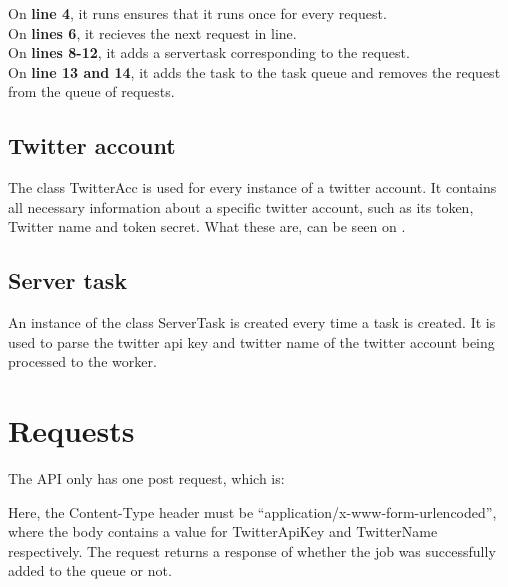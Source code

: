 On \textbf{line 4}, it runs ensures that it runs once for every request. \\
On \textbf{lines 6}, it recieves the next request in line.\\
On \textbf{lines 8-12}, it adds a servertask corresponding to the request.\\
On \textbf{line 13 and 14}, it adds the task to the task queue and removes the
request from the queue of requests.\\


\subsection{Twitter account}
The class TwitterAcc is used for every instance of a twitter account. It
contains all necessary information about a specific twitter account, such as its
token, Twitter name and token secret. What these are, can be seen on 
. 

\subsection{Server task}
An instance of the class ServerTask is created every time a task is created. It
is used to parse the twitter api key and twitter name of the twitter account
being processed to the worker.


\section{Requests}
The \ac{API} only has one post request, which is: \nl

\nl

Here, the Content-Type header must be ``application/x-www-form-urlencoded'',
where the body contains a value for TwitterApiKey and TwitterName
respectively.
The request returns a response of whether the job was successfully added to the
queue or not.



